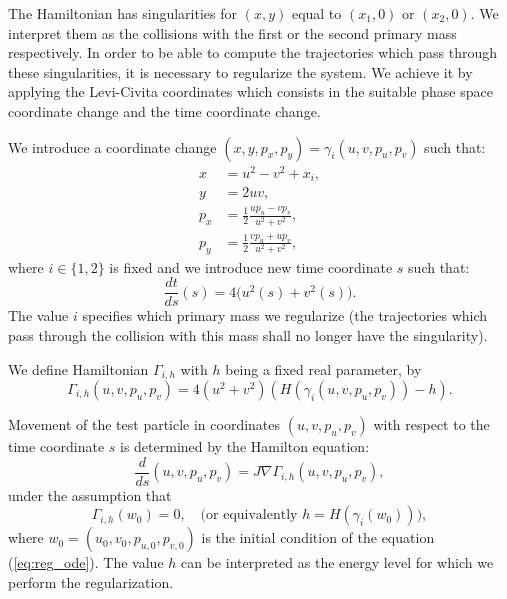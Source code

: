 \documentclass[1p]{article}
\begin{document}
The Hamiltonian has singularities for $(x,y)$ equal to $(x_1, 0)$ or $(x_2, 0)$. We interpret them as the collisions with the first or the second primary mass respectively. In order to be able to compute the trajectories which pass through these singularities, it is necessary to regularize the system. We achieve it by applying the Levi-Civita coordinates \cite{levi_civita_1906} which consists in the suitable phase space coordinate change and the time coordinate change.

We introduce a coordinate change $(x,y,p_x,p_y)=\gamma_i (u,v,p_u,p_v)$ such that:
\begin{equation}
    \label{eq:lc_coord_change}
    \begin{aligned}
        x & =u^{2}-v^{2}+x_{i},\\
        y & =2uv,\\
        p_{x} & =\frac{1}{2}\frac{up_{u}-vp_{v}}{u^{2}+v^{2}},\\
        p_{y} & =\frac{1}{2}\frac{vp_{u}+up_{v}}{u^{2}+v^{2}},
    \end{aligned}
\end{equation}
where $i \in \{ 1, 2 \}$ is fixed and we introduce new time coordinate $s$ such that:
\begin{equation}
    \label{eq:reg_time_def}
    \frac{dt}{ds}(s)=4\big(u^{2}(s)+v^{2}(s)\big).
\end{equation}
The value $i$ specifies which primary mass we regularize (the trajectories which pass through the collision with this mass shall no longer have the singularity).

We define Hamiltonian $\Gamma_{i,h}$ with $h$ being a fixed real parameter, by
\begin{equation}
    \label{eq:Gamma_i}
    \Gamma_{i,h} (u,v,p_u,p_v) = 4(u^2 + v^2) \left( H(\gamma_i(u,v,p_u,p_v)) - h \right).
\end{equation}

Movement of the test particle in coordinates $(u,v,p_u,p_v)$ with respect to the time coordinate $s$ is determined by the Hamilton equation:
\begin{equation}
    \label{eq:reg_ode}
    \frac{d}{ds}(u,v,p_{u},p_{v})=J\nabla \Gamma_{i,h} (u,v,p_{u},p_{v}),
\end{equation}
under the assumption that
\begin{equation}
    \label{eq:gamma_zero_condition}
    \Gamma_{i,h}(w_0) = 0,\quad \text{(or equivalently }h = H(\gamma_i(w_0))),
\end{equation}
where $w_0 = (u_0, v_0, p_{u,0}, p_{v,0})$ is the initial condition of the equation (\ref{eq:reg_ode}). The value $h$ can be interpreted as the energy level for which we perform the regularization.
\end{document}
